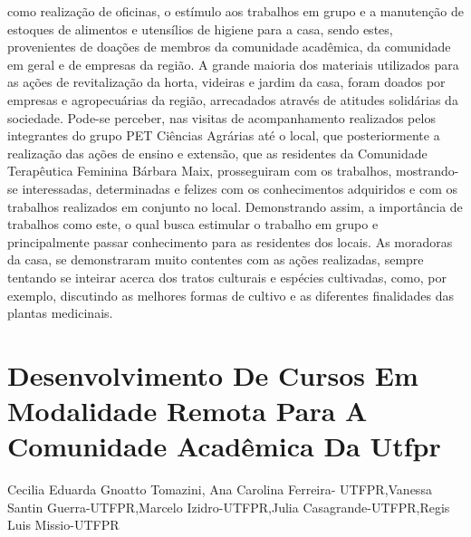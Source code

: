 como realização de oficinas, o estímulo aos trabalhos em grupo e a manutenção de estoques de
alimentos e utensílios de higiene para a casa, sendo estes, provenientes de doações de membros
da comunidade acadêmica, da comunidade em geral e de empresas da região. A grande maioria
dos materiais utilizados para as ações de revitalização da horta, videiras e jardim da casa, foram
doados por empresas e agropecuárias da região, arrecadados através de atitudes solidárias da
sociedade.
Pode-se perceber, nas visitas de acompanhamento realizados pelos integrantes do grupo
PET Ciências Agrárias até o local, que posteriormente a realização das ações de ensino e
extensão, que as residentes da Comunidade Terapêutica Feminina Bárbara Maix, prosseguiram
com os trabalhos, mostrando-se interessadas, determinadas e felizes com os conhecimentos
adquiridos e com os trabalhos realizados em conjunto no local. Demonstrando assim, a
importância de trabalhos como este, o qual busca estimular o trabalho em grupo e principalmente
passar conhecimento para as residentes dos locais. As moradoras da casa, se demonstraram
muito contentes com as ações realizadas, sempre tentando se inteirar acerca dos tratos culturais e
espécies cultivadas, como, por exemplo, discutindo as melhores formas de cultivo e as diferentes
finalidades das plantas medicinais.




\section*{Desenvolvimento De Cursos Em Modalidade Remota Para A Comunidade Acadêmica Da Utfpr }

Cecilia Eduarda Gnoatto Tomazini, Ana Carolina Ferreira- UTFPR,Vanessa Santin Guerra-UTFPR,Marcelo Izidro-UTFPR,Julia Casagrande-UTFPR,Regis Luis Missio-UTFPR

